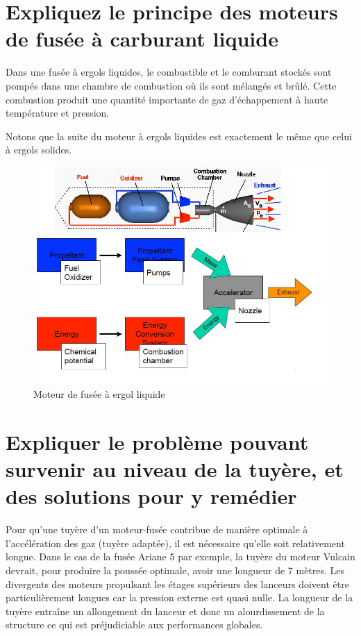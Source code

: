 \documentclass{report}
\begin{document}
\section{Expliquez le principe des moteurs de fusée à carburant liquide}

Dans une fusée à ergols liquides, le combustible et le comburant stockés sont pompés dans une chambre de combustion où ils sont mélangés et brûlé. Cette combustion produit une quantité importante de gaz d'échappement à haute température et pression.

Notons que la suite du moteur à ergols liquides est exactement le même que celui à ergols solides.

\begin{figure}[h!]
    \centering
    \includegraphics[scale=0.6]{41.JPG}
    \caption{Moteur de fusée à ergol liquide}
    \label{41}
\end{figure}



\section{Expliquer le problème pouvant survenir au niveau de la tuyère, et des solutions pour y remédier}

Pour qu'une tuyère d'un moteur-fusée contribue de manière optimale à l'accélération des gaz (tuyère adaptée), il est nécessaire qu'elle soit relativement longue. Dans le cas de la fusée Ariane 5 par exemple, la tuyère du moteur Vulcain devrait, pour produire la poussée optimale, avoir une longueur de 7 mètres. Les divergents des moteurs propulsant les étages supérieurs des lanceurs doivent être particulièrement longues car la pression externe est quasi nulle. La longueur de la tuyère entraîne un allongement du lanceur et donc un alourdissement de la structure ce qui est préjudiciable aux performances globales.
\end{document}
